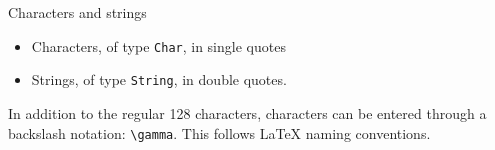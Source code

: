 \begin{block}{Characters and strings}
  \begin{itemize}
  \item Characters, of type \lstinline{Char}, in single quotes
  \item Strings, of type \lstinline{String}, in double quotes.
  \end{itemize}
  In addition to the regular 128  characters,
   characters can be entered through a backslash notation:
  \verb+\gamma+. This follows \LaTeX{} naming conventions.
\end{block}

\begin{comment}
  \Level 1 {Initialization}

  It is a possible to give a variable a value right when it's
  created. This is known as
  \emph{initialization}\index{variable!initialization} and it's
  different from creating the variable and later assigning to it
  (section~\ref{c:assign}).

  \begin{block}{Initialization syntax}
    \label{sl:init-var}
    There are two ways of initializing a variable
    \begin{lstlisting}
      int i = 5;
      int j{6};
    \end{lstlisting}
    Note that writing 
    \begin{lstlisting}
      int i;
      i = 7;
    \end{lstlisting}
    is not an initialization: it's a declaration followed by an
    assignment.

    If you declare a variable but not initialize, you can not count on
    its value being anything, in particular not zero. Such implicit initialization is
    often omitted for performance reasons.
  \end{block}

  \Level 0 {Input/Output, or I/O as we say}
  \label{sec:io}

  A program typically produces output. For now we will only display
  output on the screen, but output to file is possible too.  Regarding
  input, sometimes a program has all information for its computations,
  but it is also possible to base the computation on user input.

  \begin{block}{Terminal output}
    \label{sl:cout}
    You have already seen \indextermtt{cout}:
    \begin{lstlisting}
      float x = 5;
      cout << "Here is the root: " << sqrt(x) << endl;
    \end{lstlisting}
  \end{block}


\end{comment}
